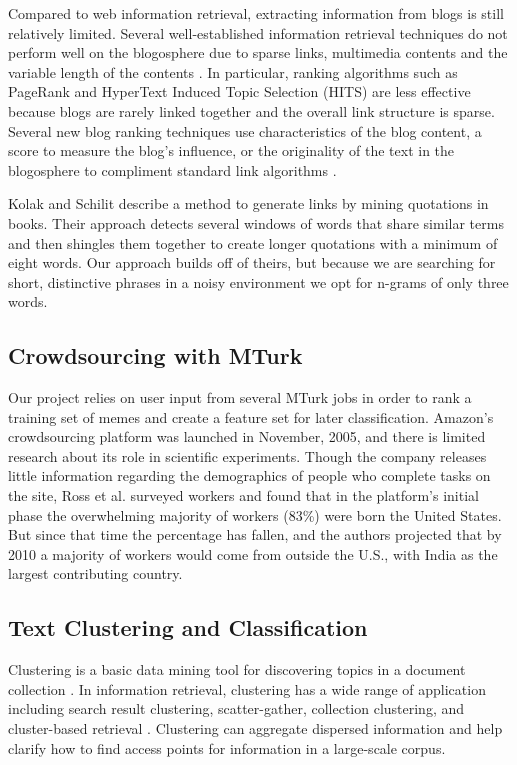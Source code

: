 \documentclass{sig-alternate}
\begin{document}
Compared to web information retrieval, extracting information from blogs is still relatively limited. Several well-established information retrieval techniques do not perform well on the blogosphere due to sparse links, multimedia contents and the variable length of the contents \cite{Agarwal}. In particular, ranking algorithms such as PageRank \cite{Brin1998a} and HyperText Induced Topic Selection (HITS) \cite{Kleinberg1999} are less effective because blogs are rarely linked together and the overall link structure is sparse. Several new blog ranking techniques use characteristics of the blog content, a score to measure the blog's influence, or the originality of the text in the blogosphere to compliment standard link algorithms \cite{Hassan2009,Song2007}. 

Kolak and Schilit \cite{Kolak2008} describe a method to generate links by mining quotations in books. Their approach detects several windows of words that share similar terms and then shingles them together to create longer quotations with a minimum of eight words. Our approach builds off of theirs, but because we are searching for short, distinctive phrases in a noisy environment we opt for n-grams of only three words.
 
\subsection{Crowdsourcing with MTurk}
Our project relies on user input from several MTurk jobs in order to rank a training set of memes and create a feature set for later classification. Amazon's crowdsourcing platform was launched in November, 2005, and there is limited research about its role in scientific experiments. Though the company releases little information regarding the demographics of people who complete tasks on the site, Ross et al. \cite{Ross2010} surveyed workers and found that in the platform's initial phase the overwhelming majority of workers (83\%) were born the United States. But since that time the percentage has fallen, and the authors projected that by 2010 a majority of workers would come from outside the U.S., with India as the largest contributing country.

\subsection{Text Clustering and Classification}
Clustering is a basic data mining tool for discovering topics in a document collection \cite{Jayabharathy2011}. In information retrieval, clustering has a wide range of application including search result clustering, scatter-gather, collection clustering, and cluster-based retrieval \cite{citeulike:2709781}. Clustering can aggregate dispersed information and help clarify how to find access points for information in a large-scale corpus.
\end{document}
